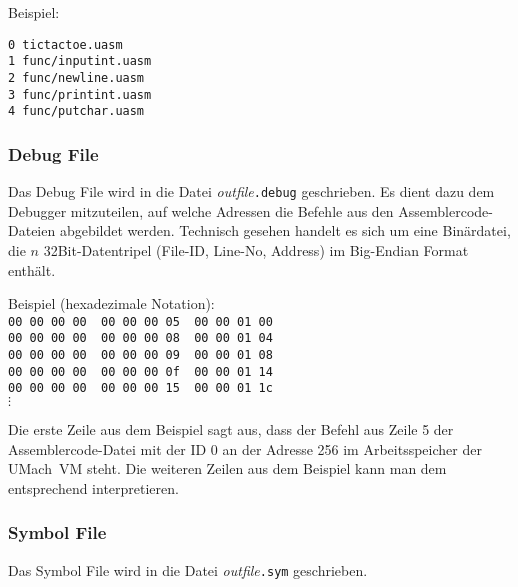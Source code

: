 Beispiel:
\begin{lstlisting}
0 tictactoe.uasm
1 func/inputint.uasm
2 func/newline.uasm
3 func/printint.uasm
4 func/putchar.uasm
\end{lstlisting}

\subsubsection{Debug File}

Das Debug File wird in die Datei \emph{outfile}\texttt{.debug} geschrieben.
Es dient dazu dem Debugger mitzuteilen, auf welche Adressen die Befehle aus den
Assemblercode-Dateien abgebildet werden. Technisch gesehen handelt es sich um
eine Binärdatei, die $n$ 32Bit-Datentripel (File-ID, Line-No, Address) im
Big-Endian Format enthält.

Beispiel (hexadezimale Notation):\\
\texttt{00 00 00 00 \vline\ 00 00 00 05 \vline\ 00 00 01 00}\\
\texttt{00 00 00 00 \vline\ 00 00 00 08 \vline\ 00 00 01 04}\\
\texttt{00 00 00 00 \vline\ 00 00 00 09 \vline\ 00 00 01 08}\\
\texttt{00 00 00 00 \vline\ 00 00 00 0f \vline\ 00 00 01 14}\\
\texttt{00 00 00 00 \vline\ 00 00 00 15 \vline\ 00 00 01 1c}\\
$\vdots$

Die erste Zeile aus dem Beispiel sagt aus, dass der Befehl aus Zeile 5 der
Assemblercode-Datei mit der ID 0 an der Adresse 256 im Arbeitsspeicher der
UMach~VM steht. Die weiteren Zeilen aus dem Beispiel kann man dem entsprechend
interpretieren.

\subsubsection{Symbol File}

Das Symbol File wird in die Datei \emph{outfile}\texttt{.sym} geschrieben.
